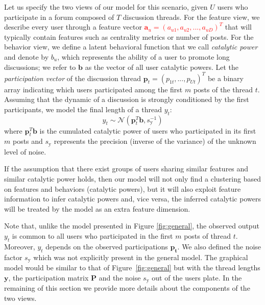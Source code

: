 \documentclass[smallextended]{svjour3}          %
\newcommand\alberto[1]{\textcolor{red}{#1}}
\begin{document}
Let us specify the two views of our model for this scenario, given $U$ users who participate in a forum composed of $T$ discussion threads. For the feature view, we describe every user through a feature vector \alberto{$\mathbf{a}_u=(a_{u1}, a_{u2},...,a_{uD})^T$} that will typically contain features such as centrality metrics or number of posts. For the behavior view, we define a latent behavioral function that we call \textit{catalytic power} and denote by $b_u$, which represents the ability of a user to promote long discussions; we refer to $\mathbf{b}$ as the vector of all user catalytic powers. Let the \textit{participation vector} of the discussion thread $\mathbf{p}_t = (p_{1t},...,p_{Ut})^T$ be a binary array indicating which users participated among the first $m$ posts of the thread $t$. Assuming  that the dynamic of a discussion is strongly conditioned by the first participants, we model the final length of a thread $y_t$:
\begin{equation*}
y_t \sim \mathcal{N}(\mathbf{p}_t^T\mathbf{b}, s_{\text{y}}^{-1})
\end{equation*} 
where $\mathbf{p}_t^T\mathbf{b}$ is the cumulated catalytic power of users who participated in its first $m$ posts and $s_{\text{y}}$ represents the precision (inverse of the variance) of the unknown level of noise.

If the assumption that there exist groups of users sharing similar features and similar catalytic power holds, then our model will not only find a clustering based on features and behaviors (catalytic powers), but it will also exploit feature information to infer catalytic powers and, vice versa, the inferred catalytic powers will be treated by the model as an extra feature dimension.

Note that, unlike the model presented in Figure \ref{fig:general}, the observed output $y_t$ is common to all users who participated in the first $m$ posts of thread $t$. Moreover, $y_t$ depends on the observed participations $\mathbf{p_t}$. We also defined the noise factor $s_{\text{y}}$ which was not explicitly present in the general model. The graphical model would be similar to that of Figure~\ref{fig:general} but with the thread lengths $\mathbf{y}$, the participation matrix $\mathbf{P}$ and the noise $s_{\text{y}}$ out of the users plate. In the remaining of this section we provide more details about the components of the two views.
\end{document}
